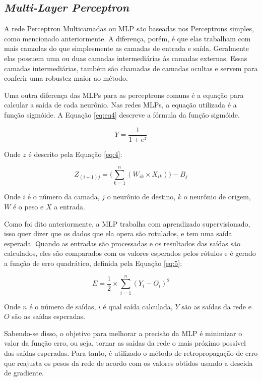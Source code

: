 \subsection{\textit{Multi-Layer Perceptron}}
\label{subsecao:2:2:2}


A rede Perceptron Multicamadas ou \ac{MLP} são baseadas nos Perceptrons simples, como mencionado anteriormente. A diferença, porém, é que elas trabalham com mais camadas do que simplesmente as camadas de entrada e saída. Geralmente elas possuem uma ou duas camadas intermediárias às camadas externas. Essas camadas intermediárias, também são chamadas de camadas ocultas e servem para conferir uma robustez maior ao método.

Uma outra diferença das \ac{MLP}s para as perceptrons comuns é a equação para calcular a saída de cada neurônio. Nas redes \ac{MLP}s, a equação utilizada é a função sigmóide. A Equação \ref{eq:eq4} descreve a fórmula da função sigmóide.

\begin{equation}
Y= \dfrac{1}{1+e^z}
\label{eq:eq4}
\end{equation}

Onde $z$ é descrito pela Equação \ref{eq:4}:

\begin{equation}
Z_{(i+1) j} = \Big(\sum_{k=1}^{n} (W_{i k}\times X_{i k})\Big)-B_j
\label{eq:4}
\end{equation}

Onde $i$ é o número da camada, $j$ o neurônio de destino, $k$ o neurônio de origem, $W$ é o peso e $X$ a entrada.

Como foi dito anteriormente, a \ac{MLP} trabalha com aprendizado supervisionado, isso quer dizer que os dados que ela opera são rotulados, e tem uma saída esperada. Quando as entradas são processadas e os resultados das saídas são calculados, eles são comparados com os valores esperados pelos rótulos e é gerado a função de erro quadrático, definida pela Equação \ref{eq:5}:

\begin{equation}
E=\dfrac{1}{2}\times \sum_{i=1}^{n}(Y_i-O_i)^2
\label{eq:5}
\end{equation}

Onde $n$ é o número de saídas, $i$ é qual saída calculada, $Y$ são as saídas da rede e $O$ são as saídas esperadas.

Sabendo-se disso, o objetivo para melhorar a precisão da \ac{MLP} é minimizar o valor da função erro, ou seja, tornar as saídas da rede o mais próximo possível das saídas esperadas. Para tanto, é utilizado o método de retropropagação de erro que reajusta os pesos da rede de acordo com os valores obtidos usando a descida de gradiente.


